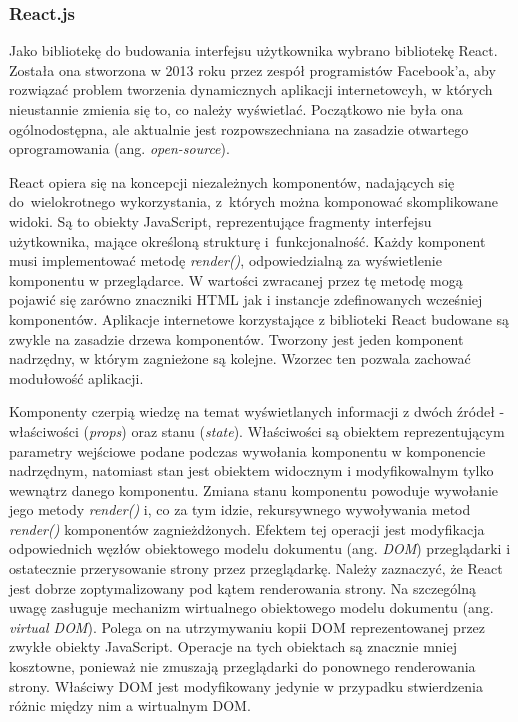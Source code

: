 \documentclass[12pt,a4paper,polish,thesis]{dcsbook}
\begin{document}
{	\subsubsection{React.js}

	 Jako bibliotekę do budowania interfejsu użytkownika wybrano bibliotekę React.
	 Została ona stworzona w 2013 roku przez zespół programistów Facebook'a, aby rozwiązać problem tworzenia dynamicznych aplikacji internetowcyh, w których nieustannie zmienia się to, co należy wyświetlać. Początkowo nie była ona ogólnodostępna, ale aktualnie jest rozpowszechniana na zasadzie otwartego oprogramowania (ang. \textit{open-source}).

   React opiera się na koncepcji niezależnych komponentów, nadających się do~wielokrotnego wykorzystania, z~których można komponować skomplikowane widoki. Są to obiekty JavaScript, reprezentujące fragmenty interfejsu użytkownika, mające określoną strukturę i~funkcjonalność. Każdy komponent musi implementować metodę \textit{render()}, odpowiedzialną za wyświetlenie komponentu w przeglądarce. W wartości zwracanej przez tę metodę mogą pojawić się zarówno znaczniki HTML jak i instancje zdefinowanych wcześniej komponentów. Aplikacje internetowe korzystające z biblioteki React budowane są zwykle na zasadzie drzewa komponentów. Tworzony jest jeden komponent nadrzędny, w którym zagnieżone są kolejne. Wzorzec ten pozwala zachować modułowość aplikacji.

   Komponenty czerpią wiedzę na temat wyświetlanych informacji z dwóch źródeł - właściwości (\textit{props}) oraz stanu (\textit{state}). Właściwości są obiektem reprezentującym parametry wejściowe podane podczas wywołania komponentu w komponencie nadrzędnym, natomiast stan jest obiektem widocznym i modyfikowalnym tylko wewnątrz danego komponentu. Zmiana stanu komponentu powoduje wywołanie jego metody \textit{render()} i, co za tym idzie, rekursywnego wywoływania metod \textit{render()} komponentów zagnieżdżonych. Efektem tej operacji jest modyfikacja odpowiednich węzłów obiektowego modelu dokumentu (ang. \textit{DOM}) przeglądarki i ostatecznie przerysowanie strony przez przeglądarkę. Należy zaznaczyć, że React jest dobrze zoptymalizowany pod kątem renderowania strony. Na szczególną uwagę zasługuje mechanizm wirtualnego obiektowego modelu dokumentu (ang. \textit{virtual DOM}). Polega on na utrzymywaniu kopii DOM reprezentowanej przez zwykłe obiekty JavaScript. Operacje na tych obiektach są znacznie mniej kosztowne, ponieważ nie zmuszają przeglądarki do ponownego renderowania strony. Właściwy DOM jest modyfikowany jedynie w przypadku stwierdzenia różnic między nim a wirtualnym DOM.

}
\end{document}
